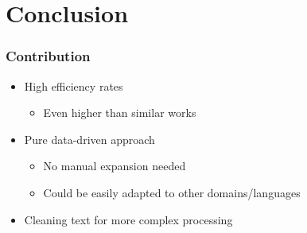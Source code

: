 \section{Conclusion}


\begin{frame}
	\frametitle{Contribution}
	\begin{itemize} \myspacing
		\item High efficiency rates
		\begin{itemize}
	                \item Even higher than similar works
                \end{itemize}
                \item Pure data-driven approach
                \begin{itemize}
                		\item No manual expansion needed
			\item Could be easily adapted to other domains/languages
                \end{itemize}
		\item Cleaning text for more complex processing
	\end{itemize}
\end{frame}

